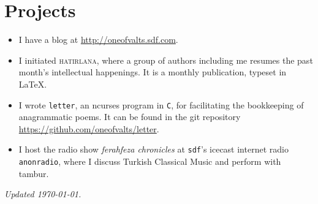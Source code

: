 \documentclass[11pt, a4paper, twocolumn]{memoir}
\begin{document}
\section*{Projects}
\begin{itemize}[leftmargin=*]
  \item I have a blog at \url{http://oneofvalts.sdf.com}.
  \item I initiated \textsc{hatirlana}, where a group of authors
        including me resumes the past month's intellectual happenings. It is
        a monthly publication, typeset in \LaTeX.
  \item I wrote \texttt{letter}, an ncurses program in \texttt{C}, for
        facilitating the bookkeeping of anagrammatic poems. It can be found
        in the git repository \url{https://github.com/oneofvalts/letter}.
  \item I host the radio show \textit{ferahfeza chronicles} at \texttt{sdf}'s
        icecast internet radio \texttt{anonradio}, where I discuss Turkish
        Classical Music and perform with tambur.
\end{itemize}
\vfill\hfill{}\tiny\textit{Updated \today.}
\end{document}
